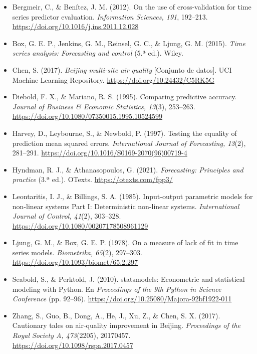 \documentclass[11pt,letterpaper]{article}
\begin{document}
\begin{itemize}
    \setlength{\itemsep}{2pt}
    \item[] Bergmeir, C., \& Benítez, J. M. (2012). On the use of cross-validation for time series predictor evaluation. \textit{Information Sciences, 191}, 192--213. \url{https://doi.org/10.1016/j.ins.2011.12.028}
    \item[] Box, G. E. P., Jenkins, G. M., Reinsel, G. C., \& Ljung, G. M. (2015). \textit{Time series analysis: Forecasting and control} (5.ª ed.). Wiley.
    \item[] Chen, S. (2017). \textit{Beijing multi-site air quality} [Conjunto de datos]. UCI Machine Learning Repository. \url{https://doi.org/10.24432/C5RK5G}
    \item[] Diebold, F. X., \& Mariano, R. S. (1995). Comparing predictive accuracy. \textit{Journal of Business \& Economic Statistics, 13}(3), 253--263. \url{https://doi.org/10.1080/07350015.1995.10524599}
    \item[] Harvey, D., Leybourne, S., \& Newbold, P. (1997). Testing the equality of prediction mean squared errors. \textit{International Journal of Forecasting, 13}(2), 281--291. \url{https://doi.org/10.1016/S0169-2070(96)00719-4}
    \item[] Hyndman, R. J., \& Athanasopoulos, G. (2021). \textit{Forecasting: Principles and practice} (3.ª ed.). OTexts. \url{https://otexts.com/fpp3/}
    \item[] Leontaritis, I. J., \& Billings, S. A. (1985). Input-output parametric models for non-linear systems Part I: Deterministic non-linear systems. \textit{International Journal of Control, 41}(2), 303--328. \url{https://doi.org/10.1080/00207178508961129}
    \item[] Ljung, G. M., \& Box, G. E. P. (1978). On a measure of lack of fit in time series models. \textit{Biometrika, 65}(2), 297--303. \url{https://doi.org/10.1093/biomet/65.2.297}
    \item[] Seabold, S., \& Perktold, J. (2010). statsmodels: Econometric and statistical modeling with Python. En \textit{Proceedings of the 9th Python in Science Conference} (pp. 92--96). \url{https://doi.org/10.25080/Majora-92bf1922-011}
    \item[] Zhang, S., Guo, B., Dong, A., He, J., Xu, Z., \& Chen, S. X. (2017). Cautionary tales on air-quality improvement in Beijing. \textit{Proceedings of the Royal Society A, 473}(2205), 20170457. \url{https://doi.org/10.1098/rspa.2017.0457}
\end{itemize}
\end{document}
